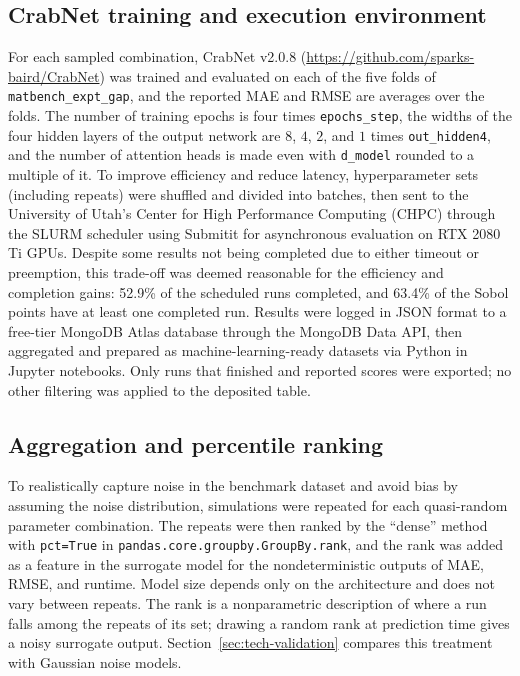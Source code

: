 \documentclass[pdflatex,sn-mathphys-num]{sn-jnl}
\begin{document}
\subsection{CrabNet training and execution environment}\label{sec:methods-execution}

For each sampled combination, CrabNet v2.0.8 (\url{https://github.com/sparks-baird/CrabNet}) was trained and evaluated on each of the five folds of \texttt{matbench\_expt\_gap}, and the reported MAE and RMSE are averages over the folds. The number of training epochs is four times \texttt{epochs\_step}, the widths of the four hidden layers of the output network are $8$, $4$, $2$, and $1$ times \texttt{out\_hidden4}, and the number of attention heads is made even with \texttt{d\_model} rounded to a multiple of it. To improve efficiency and reduce latency, hyperparameter sets (including repeats) were shuffled and divided into batches, then sent to the University of Utah's Center for High Performance Computing (CHPC) through the SLURM scheduler using Submitit for asynchronous evaluation on RTX 2080 Ti GPUs. Despite some results not being completed due to either timeout or preemption, this trade-off was deemed reasonable for the efficiency and completion gains: 52.9\% of the scheduled runs completed, and 63.4\% of the Sobol points have at least one completed run. Results were logged in JSON format to a free-tier MongoDB Atlas database through the MongoDB Data API, then aggregated and prepared as machine-learning-ready datasets via Python in Jupyter notebooks. Only runs that finished and reported scores were exported; no other filtering was applied to the deposited table.

\subsection{Aggregation and percentile ranking}\label{sec:methods-aggregation}

To realistically capture noise in the benchmark dataset and avoid bias by assuming the noise distribution, simulations were repeated for each quasi-random parameter combination. The repeats were then ranked by the ``dense'' method with \texttt{pct=True} in \texttt{pandas.core.groupby.GroupBy.rank}, and the rank was added as a feature in the surrogate model for the nondeterministic outputs of MAE, RMSE, and runtime. Model size depends only on the architecture and does not vary between repeats. The rank is a nonparametric description of where a run falls among the repeats of its set; drawing a random rank at prediction time gives a noisy surrogate output. Section~\ref{sec:tech-validation} compares this treatment with Gaussian noise models.
\end{document}

